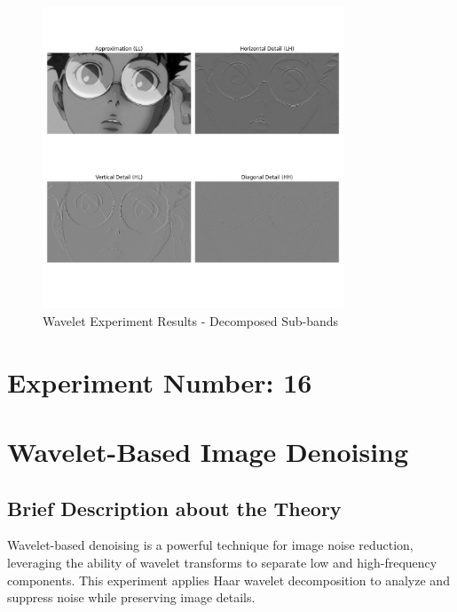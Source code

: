\documentclass[12pt,a4paper]{article}
\begin{document}
\begin{figure}[H]
  \centering
  \includegraphics[width=0.8\textwidth]{wavelet/decomposition.png}
  \caption{Wavelet Experiment Results - Decomposed Sub-bands}
  \label{fig:wavelet}
\end{figure}

\newpage
\section*{Experiment Number: 16}
\section{Wavelet-Based Image Denoising}

\subsection{Brief Description about the Theory}
Wavelet-based denoising is a powerful technique for image noise reduction, leveraging the ability of wavelet transforms to separate low and high-frequency components. This experiment applies Haar wavelet decomposition to analyze and suppress noise while preserving image details.
\end{document}
